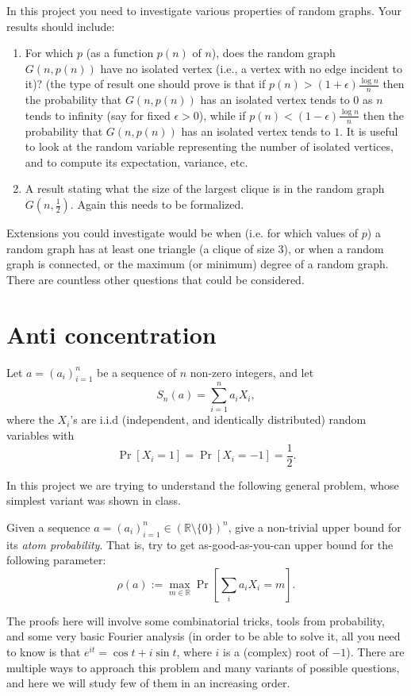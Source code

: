 \documentclass[11pt,letterpaper]{article}
\begin{document}
In this project you need to investigate various properties of random graphs. Your results should include:
\begin{enumerate}
\item
For which $p$ (as a function $p(n)$ of $n$), does the random graph $G(n,p(n))$ have no isolated vertex (i.e., a vertex with no edge incident to it)? (the type of result one should prove is that if $p(n)>(1+\epsilon)\frac{\log n}{n}$ then the probability that $G(n,p(n))$ has an isolated vertex tends to $0$ as $n$ tends to infinity (say for fixed $\epsilon>0$), while if $p(n)<(1-\epsilon)\frac{\log n}{n}$ then the probability that $G(n,p(n))$ has an isolated vertex tends to $1$. It is useful to look at the random variable representing the number of isolated vertices, and to compute its expectation, variance, etc.
\item
A result stating what the size of the largest clique is in the random graph $G(n,\frac{1}{2})$. Again  this needs to be formalized.

\end{enumerate}

Extensions you could investigate would be when (i.e. for which values of $p$) a random graph has at least one triangle (a clique of size 3), or when a random graph is connected, or the maximum (or minimum) degree of a random graph. There are countless other questions that could be considered.


\section{Anti concentration} 

Let $a=(a_i)_{i=1}^n$ be a sequence of $n$ non-zero integers, and let
$$S_n(a)=\sum_{i=1}^na_iX_i,$$
where the $X_i$'s are i.i.d (independent, and identically distributed) random variables with $$\Pr[X_i=1]=\Pr[X_i=-1]=\frac 12.$$

In this project we are trying to understand the following general problem, whose simplest variant was shown in class. 

Given a sequence $a=(a_i)_{i=1}^n\in \left(\mathbb{R}\setminus\{0\}\right)^n$, give a non-trivial upper bound for its  \emph{atom probability}. That is, try to get as-good-as-you-can upper bound for the following parameter: 
$$\rho(a):=\max_{m\in \mathbb{R}}\Pr\left[\sum_i a_iX_i=m\right].$$

The proofs here will involve some combinatorial tricks, tools from probability, and some very basic Fourier analysis (in order to be able to solve it, all you need to know is that $e^{it}=\cos t+i\sin t$, where $i$ is a (complex) root of $-1$). There are multiple ways to approach this problem and many variants of possible questions, and here we will study few of them in an increasing order. 
\end{document}
